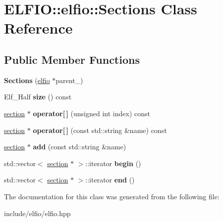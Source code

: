\hypertarget{class_e_l_f_i_o_1_1elfio_1_1_sections}{}\section{E\+L\+F\+IO\+:\+:elfio\+:\+:Sections Class Reference}
\label{class_e_l_f_i_o_1_1elfio_1_1_sections}
\subsection*{Public Member Functions}
\begin{DoxyCompactItemize}
\item 
{\bfseries Sections} (\hyperlink{class_e_l_f_i_o_1_1elfio}{elfio} $\ast$parent\+\_\+)\hypertarget{class_e_l_f_i_o_1_1elfio_1_1_sections_a77095b63b7e9e56e40cfc94dad24c45e}{}\label{class_e_l_f_i_o_1_1elfio_1_1_sections_a77095b63b7e9e56e40cfc94dad24c45e}

\item 
Elf\+\_\+\+Half {\bfseries size} () const \hypertarget{class_e_l_f_i_o_1_1elfio_1_1_sections_a5c66bdb3ab662752c4968d8cd1a1a490}{}\label{class_e_l_f_i_o_1_1elfio_1_1_sections_a5c66bdb3ab662752c4968d8cd1a1a490}

\item 
\hyperlink{class_e_l_f_i_o_1_1section}{section} $\ast$ {\bfseries operator\mbox{[}$\,$\mbox{]}} (unsigned int index) const \hypertarget{class_e_l_f_i_o_1_1elfio_1_1_sections_a79aba75793609c2a85409478cb0fe1f8}{}\label{class_e_l_f_i_o_1_1elfio_1_1_sections_a79aba75793609c2a85409478cb0fe1f8}

\item 
\hyperlink{class_e_l_f_i_o_1_1section}{section} $\ast$ {\bfseries operator\mbox{[}$\,$\mbox{]}} (const std\+::string \&name) const \hypertarget{class_e_l_f_i_o_1_1elfio_1_1_sections_a441cba399775295f6cc876c779937ade}{}\label{class_e_l_f_i_o_1_1elfio_1_1_sections_a441cba399775295f6cc876c779937ade}

\item 
\hyperlink{class_e_l_f_i_o_1_1section}{section} $\ast$ {\bfseries add} (const std\+::string \&name)\hypertarget{class_e_l_f_i_o_1_1elfio_1_1_sections_af60206f1e95ae37985df476419ce875e}{}\label{class_e_l_f_i_o_1_1elfio_1_1_sections_af60206f1e95ae37985df476419ce875e}

\item 
std\+::vector$<$ \hyperlink{class_e_l_f_i_o_1_1section}{section} $\ast$ $>$\+::iterator {\bfseries begin} ()\hypertarget{class_e_l_f_i_o_1_1elfio_1_1_sections_ac64b4742bb8fb0eb2bc821ae2958ecec}{}\label{class_e_l_f_i_o_1_1elfio_1_1_sections_ac64b4742bb8fb0eb2bc821ae2958ecec}

\item 
std\+::vector$<$ \hyperlink{class_e_l_f_i_o_1_1section}{section} $\ast$ $>$\+::iterator {\bfseries end} ()\hypertarget{class_e_l_f_i_o_1_1elfio_1_1_sections_ab78a91bb0162c7cf27185a16ba508c53}{}\label{class_e_l_f_i_o_1_1elfio_1_1_sections_ab78a91bb0162c7cf27185a16ba508c53}

\end{DoxyCompactItemize}


The documentation for this class was generated from the following file\+:\begin{DoxyCompactItemize}
\item 
include/elfio/elfio.\+hpp\end{DoxyCompactItemize}
